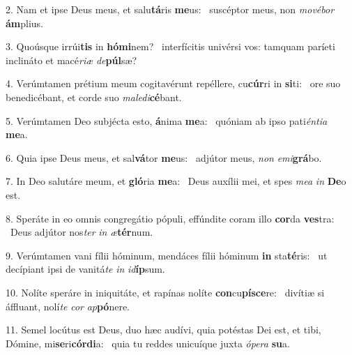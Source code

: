 2. Nam et ipse Deus meus, et salu\textbf{tá}ris \textbf{me}us: \ast\  suscéptor meus, non \textit{mo}\textit{vé}\textit{bor} \textbf{ám}plius.\

3. Quoúsque irrúi\textbf{tis} in \textbf{hó}\textbf{mi}nem? \ast\  interfícitis univérsi vos: tamquam paríeti inclináto et macé\textit{ri}\textit{æ} \textit{de}\textbf{púl}sæ?\

4. Verúmtamen prétium meum cogitavérunt repéllere, cu\textbf{cúr}ri in \textbf{si}ti: \ast\  ore suo benedicébant, et corde suo \textit{ma}\textit{le}\textit{di}\textbf{cé}bant.\

5. Verúmtamen Deo subjécta esto, \textbf{á}nima \textbf{me}a: \ast\  quóniam ab ipso pati\textit{én}\textit{ti}\textit{a} \textbf{me}a.\

6. Quia ipse Deus meus, et sal\textbf{vá}tor \textbf{me}us: \ast\  adjútor meus, \textit{non} \textit{e}\textit{mi}\textbf{grá}bo.\

7. In Deo salutáre meum, et \textbf{gló}ria \textbf{me}a: \ast\  Deus auxílii mei, et spes \textit{me}\textit{a} \textit{in} \textbf{De}o est.\

8. Speráte in eo omnis congregátio pópuli, effúndite coram illo \textbf{cor}da \textbf{ves}tra: \ast\  Deus adjútor nos\textit{ter} \textit{in} \textit{æ}\textbf{tér}num.\

9. Verúmtamen vani fílii hóminum, mendáces fílii hóminum \textbf{in} sta\textbf{té}ris: \ast\  ut decípiant ipsi de vanitá\textit{te} \textit{in} \textit{id}\textbf{íp}sum.\

10. Nolíte speráre in iniquitáte, et rapínas nolíte \textbf{con}cu\textbf{pí}\textbf{sce}re: \ast\  divítiæ si áffluant, nolí\textit{te} \textit{cor} \textit{ap}\textbf{pó}nere.\

11. Semel locútus est Deus, duo hæc audívi, quia potéstas Dei est, et tibi, Dómine, mi\textbf{se}ri\textbf{cór}\textbf{di}a: \ast\  quia tu reddes unicuíque juxta \textit{ó}\textit{pe}\textit{ra} \textbf{su}a.\


